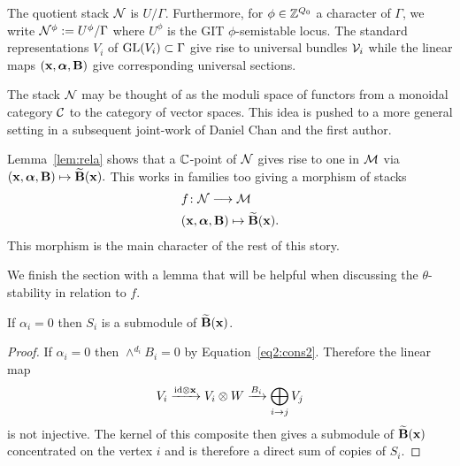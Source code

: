 \documentclass{amsart}
\newcommand{\balpha}{\boldsymbol{\alpha}}
\theoremstyle{definition}
\begin{document}
\begin{definition}
The quotient stack $\mathcal{N}$ is $U/\Gamma$.
Furthermore, for $\phi \in \mathbb{Z}^{Q_0}$ a character of $\Gamma$, we write $\mathcal{N}^\phi:= U^\phi/\Gamma$ where $U^\phi$ is the GIT $\phi$-semistable locus.
The standard representations $V_i$ of $\operatorname{GL}(V_i) \subset \Gamma$ give rise to universal bundles $\mathcal{V}_i$ while the linear maps $(\bfx, \balpha, \bfB)$ give corresponding universal sections.
\end{definition}

\begin{remark}
The stack $\mathcal{N}$ may be thought of as the moduli space of functors from a monoidal category $\mathcal{C}$ to the category of vector spaces.
This idea is pushed to a more general setting in a subsequent joint-work of Daniel Chan and the first author.
\end{remark}

Lemma~\ref{lem:rela} shows that a $\mathbb{C}$-point of $\mathcal{N}$ gives rise to one in $\mathcal{M}$ via $(\bfx, \balpha, \bfB) \mapsto \widetilde{\bfB}(\bfx).$
This works in families too giving a morphism of stacks
\begin{align*}
    & f \colon \cN \longrightarrow \cM \\
    & (\bfx, \balpha, \bfB) \mapsto \widetilde{\bfB}(\bfx).
\end{align*}
This morphism is the main character of the rest of this story.

We finish the section with a lemma that will be helpful when discussing the $\theta$-stability in relation to $f$.

\begin{lemma}\label{lem:Si}
If $\alpha_i=0$ then $S_i$ is a submodule of $\widetilde{\mathbf{B}}(\mathbf{x})$.
\end{lemma}

\begin{proof}
If $\alpha_i=0$ then $\wedge^{d_i} B_i=0$ by Equation~\ref{eq2:cons2}.
Therefore the linear map $$V_{i} \xrightarrow{\textup{id} \otimes \mathbf{x}} V_{i} \otimes W \xrightarrow{B_{i}} \bigoplus_{i \rightarrow j} V_j$$ is not injective.
The kernel of this composite then gives a submodule of $\widetilde{\mathbf{B}}(\mathbf{x})$ concentrated on the vertex $i$ and is therefore a direct sum of copies of $S_i$.
\end{proof}

\end{document}
